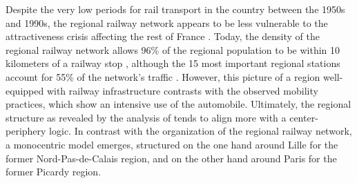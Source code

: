 \begin{refsegment}
Despite the very low periods for rail transport in the country between the 1950s and 1990s, the regional railway network appears to be less vulnerable to the attractiveness crisis affecting the rest of France \textcolor{blue}{\autocite[153]{baron_reseaux_2017}}. Today, the density of the regional railway network allows 96\% of the regional population to be within 10 kilometers of a railway stop \textcolor{blue}{\autocite[58]{ceser_hauts-de-france_mobilite_2021}}, although the 15 most important regional stations account for 55\% of the network's traffic \textcolor{blue}{\autocite[58]{ceser_hauts-de-france_mobilite_2021}}. However, this picture of a region well-equipped with railway infrastructure contrasts with the observed mobility practices, which show an intensive use of the automobile. Ultimately, the regional structure as revealed by the analysis of \textcolor{blue}{\textcite[15]{lhostis_transport_2006}} tends to align more with a center-periphery logic. In contrast with the organization of the regional railway network, a monocentric model emerges, structured on the one hand around Lille for the former Nord-Pas-de-Calais region, and on the other hand around Paris for the former Picardy region.%


\end{refsegment}
